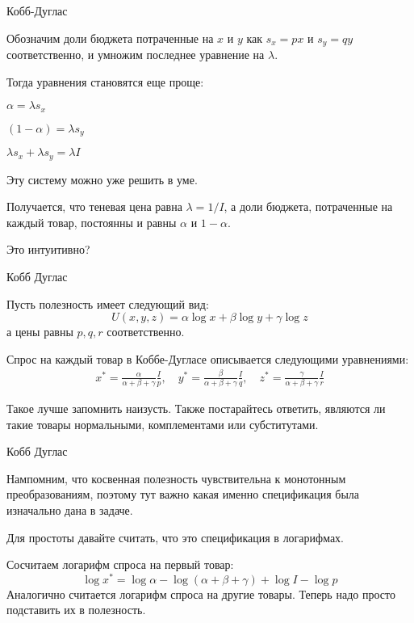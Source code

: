 \documentclass{beamer}
\begin{document}
\begin{frame}{Кобб-Дуглас}

Обозначим доли бюджета потраченные на $x$ и $y$ как $s_x= px$ и $s_y = qy$ соответственно, и умножим последнее уравнение на $\lambda$. 

Тогда уравнения становятся еще проще:

$\alpha = \lambda s_x$

$(1-\alpha) = \lambda s_y$

$\lambda s_x + \lambda s_y = \lambda I$

Эту систему можно уже решить в уме. 

Получается, что теневая цена равна $\lambda = 1/I$, а доли бюджета, потраченные на каждый товар, постоянны и равны $\alpha$ и $1-\alpha$.

Это интуитивно?

\end{frame}

\begin{frame}{Кобб Дуглас}

Пусть полезность имеет следующий вид:
$$U(x,y,z) = \alpha \log x + \beta \log y + \gamma \log z$$ 
а цены равны $p, q, r$ соответственно.

Спрос на каждый товар в Коббе-Дугласе описывается следующими уравнениями:
\begin{gather*}
x^{\ast} = \frac{\alpha}{\alpha + \beta + \gamma} \frac{I}{p}, \quad
y^{\ast} = \frac{\beta}{\alpha + \beta + \gamma} \frac{I}{q}, \quad
z^{\ast} = \frac{\gamma}{\alpha + \beta + \gamma} \frac{I}{r}
\end{gather*}

Такое лучше запомнить наизусть. Также постарайтесь ответить, являются ли такие товары нормальными, комплементами или субститутами.

\end{frame}

\begin{frame}{Кобб Дуглас}

Нампомним, что косвенная полезность чувствительна к монотонным преобразованиям, поэтому тут важно какая именно спецификация была изначально дана в задаче. 

Для простоты давайте считать, что это спецификация в логарифмах.

Сосчитаем логарифм спроса на первый товар:
$$\log x^{\ast} = \log \alpha - \log (\alpha + \beta + \gamma) + \log I - \log p$$
Аналогично считается логарифм спроса на другие товары. Теперь надо просто подставить их в полезность.

\end{frame}
\end{document}
